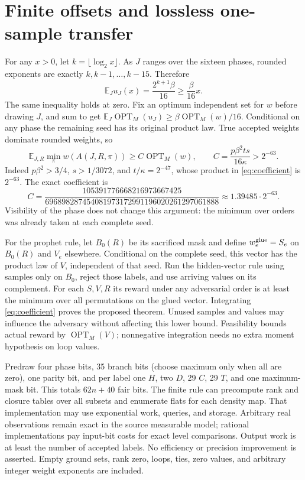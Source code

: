 \documentclass[11pt]{article}
\DeclareMathOperator{\OPT}{OPT}
\newcommand{\E}{\mathbb E}
\begin{document}
\section{Finite offsets and lossless one-sample transfer}

For any $x>0$, let $k=\lfloor\log_2x\rfloor$. As $J$ ranges over
the sixteen phases, rounded exponents are exactly $k,k-1,\ldots,k-15$.
Therefore
\[
 \E_J u_J(x)=\frac{2^{k+1}\beta}{16}\ge\frac\beta{16}x.
\]
The same inequality holds at zero. Fix an optimum independent set
for $w$ before drawing $J$, and sum to get
$\E_J\OPT_M(u_J)\ge\beta\OPT_M(w)/16$.
Conditional on any phase the remaining seed has its original product
law. True accepted weights dominate rounded weights, so
\begin{equation}\label{eq:coefficient}
 \E_{J,R}\min_\pi w(A(J,R,\pi))
 \ge C\OPT_M(w),\qquad C=\frac{p\beta^2ts}{16\kappa}>2^{-63}.
\end{equation}
Indeed $p\beta^2>3/4$, $s>1/3072$, and $t/\kappa=2^{-47}$,
whose product in \eqref{eq:coefficient} is $2^{-63}$.
The exact coefficient is
\[
 C=\frac{105391776668216973667425}
 {696898287454081973172991196020261297061888}
 \approx1.39485\cdot2^{-63}.
\]
Visibility of the phase does not change this argument: the minimum
over orders was already taken at each complete seed.

For the prophet rule, let $B_0(R)$ be its sacrificed mask and define
$w_e^{\rm glue}=S_e$ on $B_0(R)$ and $V_e$ elsewhere.
Conditional on the complete seed, this vector has the product law
of $V$, independent of that seed. Run the hidden-vector rule using
samples only on $B_0$, reject those labels, and use arriving values
on its complement. For each $S,V,R$ its reward under any adversarial
order is at least the minimum over all permutations on the glued
vector. Integrating \eqref{eq:coefficient} proves the proposed theorem.
Unused samples and values may influence the adversary without affecting
this lower bound. Feasibility bounds actual reward by $\OPT_M(V)$;
nonnegative integration needs no extra moment hypothesis on loop values.

Predraw four phase bits, 35 branch bits (choose maximum only when
all are zero), one parity bit, and per label one $H$, two $D$, 29 $C$,
29 $T$, and one maximum-mask bit. This totals $62n+40$ fair bits.
The finite rule can precompute rank and closure tables over all subsets
and enumerate flats for each density map. That implementation may use
exponential work, queries, and storage. Arbitrary real observations
remain exact in the source measurable model; rational implementations
pay input-bit costs for exact level comparisons. Output work is at
least the number of accepted labels. No efficiency or precision
improvement is asserted. Empty ground sets, rank zero, loops, ties,
zero values, and arbitrary integer weight exponents are included.
\end{document}
